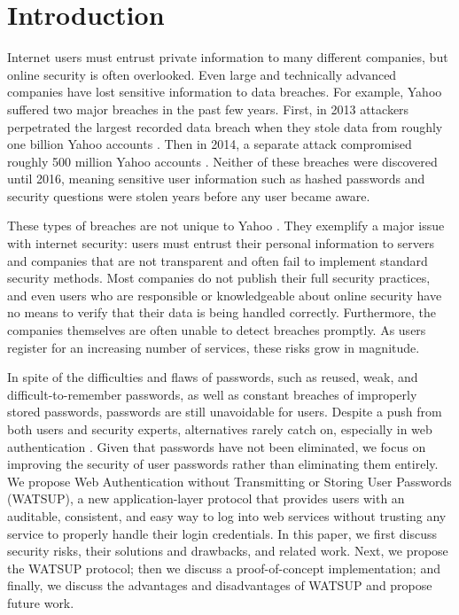 \section{Introduction}
\label{sec:intro}

Internet users must entrust private information to many different companies, but online security is often overlooked. Even large and technically advanced companies have lost sensitive information to data breaches. For example, Yahoo suffered two major breaches in the past few years. First, in 2013 attackers perpetrated the largest recorded data breach when they stole data from roughly one billion Yahoo accounts \cite{Thielman:2016}. Then in 2014, a separate attack compromised roughly 500 million Yahoo accounts \cite{Fiegerman:2016}. Neither of these breaches were discovered until 2016, meaning sensitive user information such as hashed passwords and security questions were stolen years before any user became aware.

These types of breaches are not unique to Yahoo \cite{Hunt:2016, Tabachnik:2016}. They exemplify a major issue with internet security: users must entrust their personal information to servers and companies that are not transparent and often fail to implement standard security methods. Most companies do not publish their full security practices, and even users who are responsible or knowledgeable about online security have no means to verify that their data is being handled correctly. Furthermore, the companies themselves are often unable to detect breaches promptly. As users register for an increasing number of services, these risks grow in magnitude.

In spite of the difficulties and flaws of passwords, such as reused, weak, and difficult-to-remember passwords, as well as constant breaches of improperly stored passwords, passwords are still unavoidable for users. Despite a push from both users and security experts, alternatives rarely catch on, especially in web authentication \cite{Herley:2011}. Given that passwords have not been eliminated, we focus on improving the security of user passwords rather than eliminating them entirely.
We propose Web Authentication without Transmitting or Storing User Passwords (WATSUP), a new application-layer protocol that provides users with an auditable, consistent, and easy way to log into web services without trusting any service to properly handle their login credentials. In this paper, we first discuss security risks, their solutions and drawbacks, and related work. Next, we propose the WATSUP protocol; then we discuss a proof-of-concept implementation; and finally, we discuss the advantages and disadvantages of WATSUP and propose future work.

